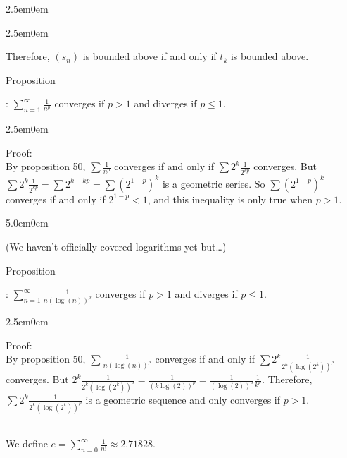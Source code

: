\documentclass{book}
\newcommand{\hThree}{%
   \color{PineGreen}
   \fontsize{13}{15}\selectfont%
}
\newcommand{\teachComment}{
   \color{Orange}%
   \fontsize{12}{14}\selectfont%
}
\newenvironment{myIndent}{%
   \begin{adjustwidth}{2.5em}{0em}%
}{%
   \end{adjustwidth}%
}
\newenvironment{myDindent}{%
   \begin{adjustwidth}{5.0em}{0em}%
}{%
   \end{adjustwidth}%
}
\newcommand{\retTwo}{\hfill\bigbreak}
\newcounter{PropNumber}
\newcommand{\propCount}[1][1]{%
   \addtocounter{PropNumber}{#1}%
   \thePropNumber%
}
\newcommand{\mySepTwo}[1][.]{%
   {\noindent\color{#1}{\rule{6.5in}{0.5mm}}}\\%
}
\begin{document}
{\begin{myIndent}
{\begin{myIndent}
            Therefore, $(s_n)$ is bounded above if and only if $t_k$ is bounded above.\retTwo
         \end{myIndent}}

         Proposition \propCount: $\sum\limits_{n=1}^\infty{\frac{1}{n^p}}$ converges if $p > 1$ and diverges if $p \leq 1$.
         
         {\begin{myIndent} \hThree
            Proof:\\
            By proposition 50, $\sum{\frac{1}{n^p}}$ converges if and only if $\sum{2^k\frac{1}{2^{kp}}}$ converges. But\\ $\sum{2^k\frac{1}{2^{kp}}} = \sum{2^{k-kp}} = \sum{\left(2^{1-p}\right)^k}$ is a geometric series. So $\sum{\left(2^{1-p}\right)^k}$\\ converges if and only if $2^{1-p} < 1$, and this inequality is only true when $p > 1$.
         \end{myIndent}}

         \newpage

         {\begin{myDindent}
            \teachComment (We haven't officially covered logarithms yet but\dots)\\ [-6pt]
         \end{myDindent}}

         Proposition \propCount: $\sum\limits_{n=1}^\infty{\frac{1}{n(\log(n))^p}}$ converges if $p > 1$ and diverges if $p \leq 1$.

         {\begin{myIndent} \hThree
            Proof:\\
            By proposition 50, $\sum{\frac{1}{n(\log(n))^p}}$ converges if and only if $\sum{2^k\frac{1}{2^{k}\left(\log(2^k)\right)^p}}$ \\converges. But $2^k\frac{1}{2^{k}\left(\log(2^k)\right)^p} = \frac{1}{\left(k\log(2)\right)^p} = \frac{1}{(\log(2))^p}\frac{1}{k^p}$. Therefore,\\ $\sum{2^k\frac{1}{2^{k}\left(\log(2^k)\right)^p}}$ is a geometric sequence and only converges if $p > 1$.\retTwo
         \end{myIndent}}
      \end{myIndent}}

      \mySepTwo[Purple]

      We define $e = \sum\limits_{n=0}^\infty{\frac{1}{n!}} \approx 2.71828$.
      
\end{document}
